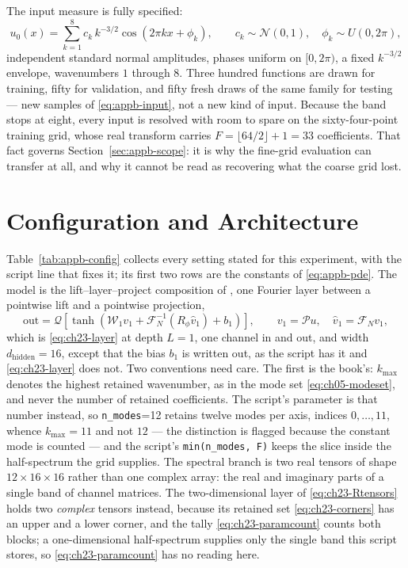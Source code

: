 The input measure is fully specified:
\begin{equation}
  \label{eq:appb-input}
  u_0(x) = \sum_{k=1}^{8} c_k\, k^{-3/2} \cos(2\pi k x + \phi_k), \qquad
  c_k \sim \mathcal{N}(0,1), \quad \phi_k \sim U(0,2\pi),
\end{equation}
independent standard normal amplitudes, phases uniform on $[0,2\pi)$, a fixed
$k^{-3/2}$ envelope, wavenumbers $1$ through $8$. Three hundred functions are drawn
for training, fifty for validation, and fifty fresh draws of the same family for
testing --- new samples of \eqref{eq:appb-input}, not a new kind of input. Because the
band stops at eight, every input is resolved with room to spare on the sixty-four-point
training grid, whose real transform carries $F=\lfloor 64/2\rfloor+1=33$ coefficients.
That fact governs Section~\ref{sec:appb-scope}: it is why the fine-grid evaluation can
transfer at all, and why it cannot be read as recovering what the coarse grid lost.

\section{Configuration and Architecture}
\label{sec:appb-config}

Table~\ref{tab:appb-config} collects every setting stated for this experiment,
with the script line that fixes it; its first two rows are the constants of
\eqref{eq:appb-pde}. The
model is the lift--layer--project composition of \cite{kovachki2023neural}, one
Fourier layer between a pointwise lift and a pointwise projection,
\begin{equation}
  \label{eq:appb-layer}
  \text{out} = \mathcal{Q}\!\left[ \tanh\!\left( \mathcal{W}_1 v_1
  + \mathcal{F}_N^{-1}\!\left( R_\phi \hat{v}_1 \right) + b_1 \right) \right],
  \qquad v_1 = \mathcal{P}u, \quad \hat{v}_1 = \mathcal{F}_N v_1,
\end{equation}
which is \eqref{eq:ch23-layer} at depth $L=1$, one channel in and out, and width
$d_{\text{hidden}}=16$, except that the bias $b_1$ is written out, as the script has
it and \eqref{eq:ch23-layer} does not. Two conventions need care. The first is the
book's: $k_{\max}$ denotes the highest retained wavenumber, as in the mode set
\eqref{eq:ch05-modeset}, and never the number of retained coefficients. The script's
parameter is that number instead, so \texttt{n\_modes}=12 retains twelve modes per
axis, indices $0,\dots,11$, whence $k_{\max}=11$ and not $12$ --- the distinction is
flagged because the constant mode is counted --- and the script's
\texttt{min(n\_modes, F)}
keeps the slice inside the half-spectrum the grid supplies. The spectral branch is two
real tensors of shape $12\times16\times16$
rather than one complex array: the real and imaginary parts of a single band of channel
matrices. The two-dimensional layer of \eqref{eq:ch23-Rtensors} holds two \emph{complex}
tensors instead, because its retained set \eqref{eq:ch23-corners} has an upper and a
lower corner, and the tally \eqref{eq:ch23-paramcount} counts both blocks; a
one-dimensional half-spectrum supplies only the single band this script stores, so
\eqref{eq:ch23-paramcount} has no reading here.

